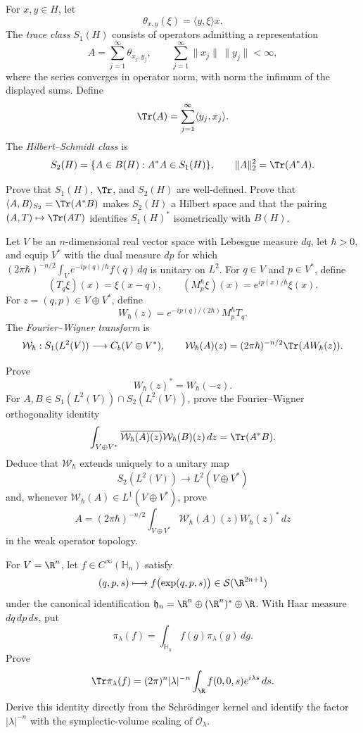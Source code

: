 \begin{exercise}
For $x,y\in H$, let
\[
\theta_{x,y}(\xi)=\langle y,\xi\rangle x.
\]
The \emph{trace class} $S_1(H)$ consists of operators admitting a representation
\[
A=\sum_{j=1}^{\infty}\theta_{x_j,y_j},
\qquad
\sum_{j=1}^{\infty}\|x_j\|\,\|y_j\|<\infty,
\]
where the series converges in operator norm, with norm the infimum of the
displayed sums.  Define
\[
\Tr(A)=\sum_{j=1}^{\infty}\langle y_j,x_j\rangle.
\]
The \emph{Hilbert--Schmidt class} is
\[
S_2(H)=\{A\in B(H):A^*A\in S_1(H)\},
\qquad
\|A\|_2^2=\Tr(A^*A).
\]

Prove that $S_1(H)$, $\Tr$, and $S_2(H)$ are well-defined.  Prove that
$\langle A,B\rangle_{S_2}=\Tr(A^*B)$ makes $S_2(H)$ a Hilbert space and
that the pairing $(A,T)\mapsto\Tr(AT)$ identifies $S_1(H)^*$ isometrically
with $B(H)$.
\end{exercise}


\begin{exercise}
Let $V$ be an $n$-dimensional real vector space with Lebesgue measure $dq$,
let $\hbar>0$, and equip $V^*$ with the dual measure $dp$ for which
$(2\pi\hbar)^{-n/2}\int_Ve^{-ip(q)/\hbar}f(q)\,dq$ is unitary on $L^2$.
For $q\in V$ and $p\in V^*$, define
\[
(T_q\xi)(x)=\xi(x-q),
\qquad
(M_p^\hbar\xi)(x)=e^{ip(x)/\hbar}\xi(x).
\]
For $z=(q,p)\in V\oplus V^*$, define
\[
W_\hbar(z)=e^{-ip(q)/(2\hbar)}M_p^\hbar T_q.
\]
The \emph{Fourier--Wigner transform} is
\[
\mathcal W_\hbar:S_1(L^2(V))\longrightarrow C_b(V\oplus V^*),
\qquad
\mathcal W_\hbar(A)(z)=(2\pi\hbar)^{-n/2}\Tr(AW_\hbar(z)).
\]

Prove
\[
W_\hbar(z)^*=W_\hbar(-z).
\]
For $A,B\in S_1(L^2(V))\cap S_2(L^2(V))$, prove the Fourier--Wigner
orthogonality identity
\[
\int_{V\oplus V^*}
\overline{\mathcal W_\hbar(A)(z)}\mathcal W_\hbar(B)(z)\,dz
=\Tr(A^*B).
\]
Deduce that $\mathcal W_\hbar$ extends uniquely to a unitary map
\[
S_2(L^2(V))\longrightarrow L^2(V\oplus V^*)
\]
and, whenever $\mathcal W_\hbar(A)\in L^1(V\oplus V^*)$, prove
\[
A=(2\pi\hbar)^{-n/2}\int_{V\oplus V^*}
\mathcal W_\hbar(A)(z)W_\hbar(z)^*\,dz
\]
in the weak operator topology.
\end{exercise}


\begin{exercise}
For $V=\R^n$, let $f\in C^\infty(\mathbb H_n)$ satisfy
\[
(q,p,s)\longmapsto f\bigl(\exp(q,p,s)\bigr)
\in\mathcal S(\R^{2n+1})
\]
under the canonical identification
$\mathfrak h_n=\R^n\oplus(\R^n)^*\oplus\R$.  With Haar measure
$dq\,dp\,ds$, put
\[
\pi_\lambda(f)
=\int_{\mathbb H_n}f(g)\pi_\lambda(g)\,dg.
\]
Prove
\[
\Tr\pi_\lambda(f)
=(2\pi)^n|\lambda|^{-n}
\int_\R f(0,0,s)e^{i\lambda s}\,ds.
\]
Derive this identity directly from the Schr\"odinger kernel and identify
the factor $|\lambda|^{-n}$ with the symplectic-volume scaling of
$\mathcal O_\lambda$.
\end{exercise}

